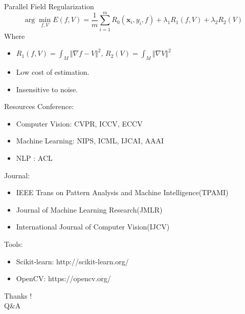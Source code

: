 \documentclass{beamer}
\newcommand{\bol}[1]{\textbf{#1}}
\begin{document}
\begin{darkframes}
  \begin{frame}{Parallel Field Regularization}
  \begin{displaymath}
  	\arg\min_{f,V} E(f, V) = \frac{1}{m}\sum_{i=1}^m R_0(\bol{x}_i, y_i, f) + \lambda_1 R_1(f,V) + \lambda_2 R_2(V)
  \end{displaymath}
  Where
  \begin{itemize}
  	\item $\displaystyle R_1(f,V) = \int_{M}\Vert \nabla f - V \Vert^2$, \qquad $\displaystyle R_2(V) = \int_{M}\Vert \nabla V \Vert^2$
  	\item Low cost of estimation.
  	\item Insensitive to noise.
  \end{itemize}
  \end{frame}
  
  
  
  \begin{frame}{Resources}
  Conference:
  \begin{itemize}
  	\item Computer Vision: CVPR, ICCV, ECCV
  	\item Machine Learning: NIPS, ICML, IJCAI, AAAI
  	\item NLP : ACL
  \end{itemize}
  
  Journal:
	\begin{itemize}
		\item IEEE Trans on Pattern Analysis and Machine Intelligence(TPAMI)
		\item Journal of Machine Learning Research(JMLR)
		\item International Journal of Computer Vision(IJCV)
	\end{itemize}	  
  
  Tools:
  \begin{itemize}
  	\item Scikit-learn: http://scikit-learn.org/
  	\item OpenCV: https://opencv.org/
  \end{itemize}
  \end{frame}
    \begin{frame}
		\centering\Huge{Thanks !}\\
		\centering\Huge{Q\&A}
	\end{frame}	  
    \end{darkframes}
\end{document}
